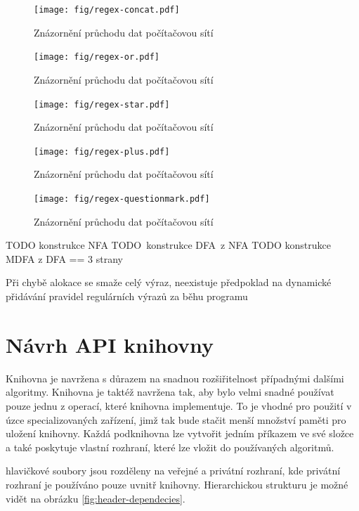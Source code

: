 \begin{figure}[!htb]
\centering
\texttt{[image: fig/regex-concat.pdf]}
\caption{Znázornění průchodu dat počítačovou sítí}
\label{fig:regex-concat}
\end{figure}

\begin{figure}[!htb]
\centering
\texttt{[image: fig/regex-or.pdf]}
\caption{Znázornění průchodu dat počítačovou sítí}
\label{fig:regex-or}
\end{figure}

\begin{figure}[!htb]
\centering
\texttt{[image: fig/regex-star.pdf]}
\caption{Znázornění průchodu dat počítačovou sítí}
\label{fig:regex-star}
\end{figure}

\begin{figure}[!htb]
\centering
\texttt{[image: fig/regex-plus.pdf]}
\caption{Znázornění průchodu dat počítačovou sítí}
\label{fig:regex-plus}
\end{figure}

\begin{figure}[!htb]
\centering
\texttt{[image: fig/regex-questionmark.pdf]}
\caption{Znázornění průchodu dat počítačovou sítí}
\label{fig:regex-questionmark}
\end{figure}
TODO konstrukce NFA
TODO konstrukce DFA z NFA
TODO konstrukce MDFA z DFA
== 3 strany

Při chybě alokace se smaže celý výraz, neexistuje předpoklad na dynamické přidávání pravidel
regulárních výrazů za běhu programu


\subsection{}

\chapter{Návrh API knihovny}
Knihovna je navržena s důrazem na snadnou rozšiřitelnost případnými dalšími algoritmy.
Knihovna je taktéž navržena tak, aby bylo velmi snadné používat pouze jednu z operací, které knihovna implementuje.
To je vhodné pro použití v úzce specializovaných zařízení, jimž tak bude stačit menší množství paměti pro uložení knihovny.
Každá podknihovna lze vytvořit jedním příkazem ve své složce a také poskytuje vlastní rozhraní, které lze vložit do používaných algoritmů.

hlavičkové soubory jsou rozděleny na veřejné a privátní rozhraní, kde privátní rozhraní je používáno pouze uvnitř knihovny. Hierarchickou strukturu je možné vidět na obrázku \ref{fig:header-dependecies}.

